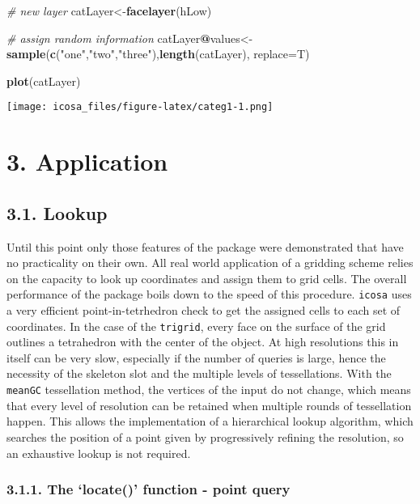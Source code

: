 \documentclass[]{article}
\newenvironment{Shaded}{\begin{snugshade}}{\end{snugshade}}
\newcommand{\KeywordTok}[1]{\textcolor[rgb]{0.13,0.29,0.53}{\textbf{#1}}}
\newcommand{\DataTypeTok}[1]{\textcolor[rgb]{0.13,0.29,0.53}{#1}}
\newcommand{\StringTok}[1]{\textcolor[rgb]{0.31,0.60,0.02}{#1}}
\newcommand{\CommentTok}[1]{\textcolor[rgb]{0.56,0.35,0.01}{\textit{#1}}}
\newcommand{\OperatorTok}[1]{\textcolor[rgb]{0.81,0.36,0.00}{\textbf{#1}}}
\newcommand{\NormalTok}[1]{#1}
\begin{document}
\begin{Shaded}
\begin{Highlighting}[]
\CommentTok{# new layer}
\NormalTok{catLayer<-}\KeywordTok{facelayer}\NormalTok{(hLow)}

\CommentTok{# assign random information}
\NormalTok{catLayer}\OperatorTok{@}\NormalTok{values<-}\KeywordTok{sample}\NormalTok{(}\KeywordTok{c}\NormalTok{(}\StringTok{"one"}\NormalTok{,}\StringTok{"two"}\NormalTok{,}\StringTok{"three"}\NormalTok{),}\KeywordTok{length}\NormalTok{(catLayer), }\DataTypeTok{replace=}\NormalTok{T)}

\KeywordTok{plot}\NormalTok{(catLayer)}
\end{Highlighting}
\end{Shaded}

\texttt{[image: icosa\_files/figure-latex/categ1-1.png]}

\section{3. Application}\label{application}

\subsection{3.1. Lookup}\label{lookup}

Until this point only those features of the package were demonstrated
that have no practicality on their own. All real world application of a
gridding scheme relies on the capacity to look up coordinates and assign
them to grid cells. The overall performance of the package boils down to
the speed of this procedure. \texttt{icosa} uses a very efficient
point-in-tetrhedron check to get the assigned cells to each set of
coordinates. In the case of the \texttt{trigrid}, every face on the
surface of the grid outlines a tetrahedron with the center of the
object. At high resolutions this in itself can be very slow, especially
if the number of queries is large, hence the necessity of the skeleton
slot and the multiple levels of tessellations. With the \texttt{meanGC}
tessellation method, the vertices of the input do not change, which
means that every level of resolution can be retained when multiple
rounds of tessellation happen. This allows the implementation of a
hierarchical lookup algorithm, which searches the position of a point
given by progressively refining the resolution, so an exhaustive lookup
is not required.

\subsubsection{\texorpdfstring{3.1.1. The `locate()' function - point
query}{3.1.1. The locate() function - point query}}\label{the-locate-function---point-query}
\end{document}
